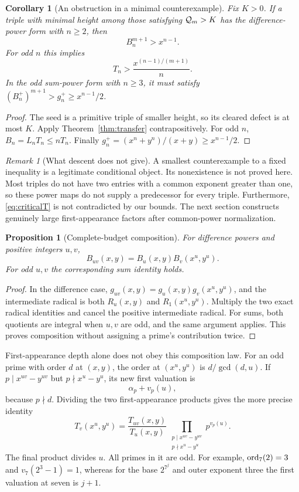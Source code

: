 \documentclass[11pt]{article}
\newtheorem{proposition}[theorem]{Proposition}
\newtheorem{corollary}[theorem]{Corollary}
\theoremstyle{definition}\newtheorem{definition}[theorem]{Definition}
\theoremstyle{remark}\newtheorem{remark}[theorem]{Remark}
\begin{document}
\begin{corollary}[An obstruction in a minimal counterexample]\label{cor:descent}
Fix $K>0$. If a triple with minimal height among those satisfying
$\mathcal Q_m>K$ has the difference-power form with $n\ge2$, then
\[
B_n^{m+1}>x^{n-1}.
\]
For odd $n$ this implies
\begin{equation}\label{eq:criticalT}
T_n>\frac{x^{(n-1)/(m+1)}}{n}.
\end{equation}
In the odd sum-power form with $n\ge3$, it must satisfy
$(B_n^+)^{m+1}>g_n^+\ge x^{n-1}/2$.
\end{corollary}
\begin{proof}
The seed is a primitive triple of smaller height, so its cleared defect is
at most $K$. Apply Theorem~\ref{thm:transfer} contrapositively. For odd
$n$, $B_n=L_nT_n\le nT_n$. Finally
$g_n^+=(x^n+y^n)/(x+y)\ge x^{n-1}/2$.
\end{proof}

\begin{remark}[What descent does not give]
A smallest counterexample to a fixed inequality is a legitimate conditional
object. Its nonexistence is not proved here. Most triples do not have two
entries with a common exponent greater than one, so these power maps do not
supply a predecessor for every triple. Furthermore, \eqref{eq:criticalT}
is not contradicted by our bounds. The next section constructs genuinely
large first-appearance factors after common-power normalization.
\end{remark}

\begin{proposition}[Complete-budget composition]\label{prop:cocycle}
For difference powers and positive integers $u,v$,
\[
B_{uv}(x,y)=B_u(x,y)B_v(x^u,y^u).
\]
For odd $u,v$ the corresponding sum identity holds.
\end{proposition}
\begin{proof}
In the difference case, $g_{uv}(x,y)=g_u(x,y)g_v(x^u,y^u)$, and the
intermediate radical is both $R_u(x,y)$ and $R_1(x^u,y^u)$. Multiply the
two exact radical identities and cancel the positive intermediate radical.
For sums, both quotients are integral when $u,v$ are odd, and the same
argument applies. This proves composition without assigning a prime's
contribution twice.
\end{proof}

First-appearance depth alone does not obey this composition law. For an odd
prime with order $d$ at $(x,y)$, the order at $(x^u,y^u)$ is
$d/\gcd(d,u)$. If $p\mid x^{uv}-y^{uv}$ but $p\nmid x^u-y^u$, its new
first valuation is
\[
\alpha_p+v_p(u),
\]
because $p\nmid d$. Dividing the two first-appearance products gives the
more precise identity
\begin{equation}\label{eq:rebase}
T_v(x^u,y^u)=\frac{T_{uv}(x,y)}{T_u(x,y)}\,
\prod_{\substack{p\mid x^{uv}-y^{uv}\\p\nmid x^u-y^u}}p^{v_p(u)}.
\end{equation}
The final product divides $u$. All primes in it are odd. For example,
$\operatorname{ord}_7(2)=3$ and $v_7(2^3-1)=1$, whereas for the base $2^{7^j}$ and outer
exponent three the first valuation at seven is $j+1$.
\end{document}
